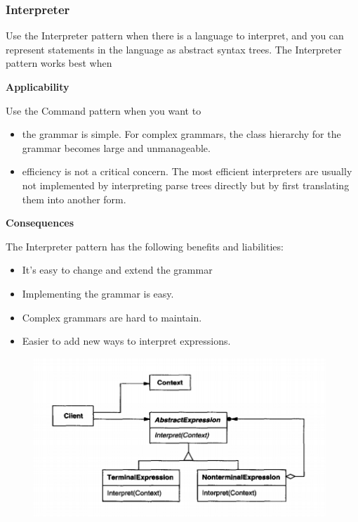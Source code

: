 \documentclass{article}
\begin{document}
\newpage
\subsubsection{Interpreter}

Use the Interpreter pattern when there is a language to interpret, and you can represent statements in the language as abstract syntax trees. The Interpreter pattern works best when

\textbf{Applicability}

Use the Command pattern when you want to

\begin{itemize}
    \item the grammar is simple. For complex grammars, the class hierarchy for the grammar becomes large and unmanageable. 
    \item efficiency is not a critical concern. The most efficient interpreters are usually not implemented by interpreting parse trees directly but by first translating them into another form.
\end{itemize}

\textbf{Consequences}

The Interpreter pattern has the following benefits and liabilities:
\begin{itemize}
    \item It's easy to change and extend the grammar
    \item Implementing the grammar is easy.
    \item Complex grammars are hard to maintain.
    \item Easier to add new ways to interpret expressions.
\end{itemize}

\begin{figure}[h]
    \centering
    \includegraphics[width=11cm]{diagrams/pattern-15-interpreter.png}
\end{figure}
\end{document}
